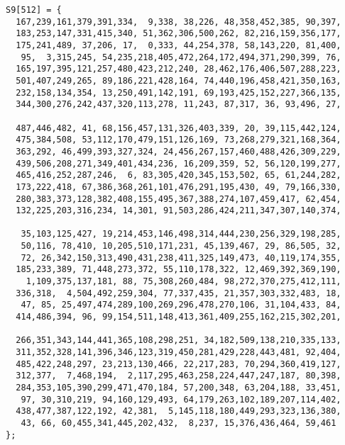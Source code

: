 \begin{lstlisting}[caption={S7 substitution box}, frame=single,breaklines=true]
 S9[512] = {
  167,239,161,379,391,334,  9,338, 38,226, 48,358,452,385, 90,397,
  183,253,147,331,415,340, 51,362,306,500,262, 82,216,159,356,177,
  175,241,489, 37,206, 17,  0,333, 44,254,378, 58,143,220, 81,400,
   95,  3,315,245, 54,235,218,405,472,264,172,494,371,290,399, 76,
  165,197,395,121,257,480,423,212,240, 28,462,176,406,507,288,223,
  501,407,249,265, 89,186,221,428,164, 74,440,196,458,421,350,163,
  232,158,134,354, 13,250,491,142,191, 69,193,425,152,227,366,135,
  344,300,276,242,437,320,113,278, 11,243, 87,317, 36, 93,496, 27,
 
  487,446,482, 41, 68,156,457,131,326,403,339, 20, 39,115,442,124,
  475,384,508, 53,112,170,479,151,126,169, 73,268,279,321,168,364,
  363,292, 46,499,393,327,324, 24,456,267,157,460,488,426,309,229,
  439,506,208,271,349,401,434,236, 16,209,359, 52, 56,120,199,277,
  465,416,252,287,246,  6, 83,305,420,345,153,502, 65, 61,244,282,
  173,222,418, 67,386,368,261,101,476,291,195,430, 49, 79,166,330,
  280,383,373,128,382,408,155,495,367,388,274,107,459,417, 62,454,
  132,225,203,316,234, 14,301, 91,503,286,424,211,347,307,140,374,
 
   35,103,125,427, 19,214,453,146,498,314,444,230,256,329,198,285,
   50,116, 78,410, 10,205,510,171,231, 45,139,467, 29, 86,505, 32,
   72, 26,342,150,313,490,431,238,411,325,149,473, 40,119,174,355,
  185,233,389, 71,448,273,372, 55,110,178,322, 12,469,392,369,190,
    1,109,375,137,181, 88, 75,308,260,484, 98,272,370,275,412,111,
  336,318,  4,504,492,259,304, 77,337,435, 21,357,303,332,483, 18,
   47, 85, 25,497,474,289,100,269,296,478,270,106, 31,104,433, 84,
  414,486,394, 96, 99,154,511,148,413,361,409,255,162,215,302,201,
 
  266,351,343,144,441,365,108,298,251, 34,182,509,138,210,335,133,
  311,352,328,141,396,346,123,319,450,281,429,228,443,481, 92,404,
  485,422,248,297, 23,213,130,466, 22,217,283, 70,294,360,419,127,
  312,377,  7,468,194,  2,117,295,463,258,224,447,247,187, 80,398,
  284,353,105,390,299,471,470,184, 57,200,348, 63,204,188, 33,451,
   97, 30,310,219, 94,160,129,493, 64,179,263,102,189,207,114,402,
  438,477,387,122,192, 42,381,  5,145,118,180,449,293,323,136,380,
   43, 66, 60,455,341,445,202,432,  8,237, 15,376,436,464, 59,461
};
\end{lstlisting}


